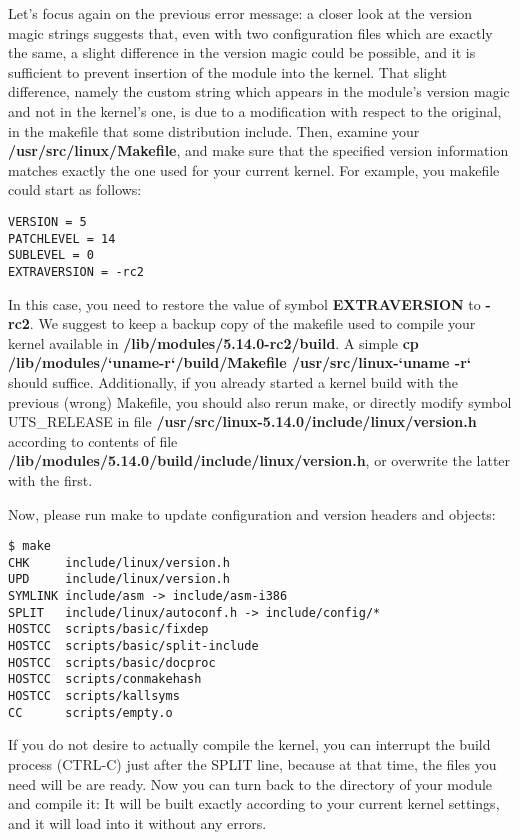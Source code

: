 \documentclass[10pt, oneside]{book}
\begin{document}
Let's focus again on the previous error message: a closer look at the version magic strings suggests that, even with two configuration files which are exactly the same, a slight difference in the version magic could be possible, and it is sufficient to prevent insertion of the module into the kernel.
That slight difference, namely the custom string which appears in the module's version magic and not in the kernel's one, is due to a modification with respect to the original, in the makefile that some distribution include.
Then, examine your \textbf{/usr/src/linux/Makefile}, and make sure that the specified version information matches exactly the one used for your current kernel. For example, you makefile could start as follows:

\begin{verbatim}
VERSION = 5
PATCHLEVEL = 14
SUBLEVEL = 0
EXTRAVERSION = -rc2
\end{verbatim}

In this case, you need to restore the value of symbol \textbf{EXTRAVERSION} to \textbf{-rc2}.
We suggest to keep a backup copy of the makefile used to compile your kernel available in \textbf{/lib/modules/5.14.0-rc2/build}.
A simple \textbf{cp /lib/modules/`uname-r`/build/Makefile /usr/src/linux-`uname -r`} should suffice.
Additionally, if you already started a kernel build with the previous (wrong) Makefile, you should also rerun make, or directly modify symbol UTS\_RELEASE in file \textbf{/usr/src/linux-5.14.0/include/linux/version.h} according to contents of file \textbf{/lib/modules/5.14.0/build/include/linux/version.h}, or overwrite the latter with the first.

Now, please run make to update configuration and version headers and objects:

\begin{verbatim}
$ make
CHK     include/linux/version.h
UPD     include/linux/version.h
SYMLINK include/asm -> include/asm-i386
SPLIT   include/linux/autoconf.h -> include/config/*
HOSTCC  scripts/basic/fixdep
HOSTCC  scripts/basic/split-include
HOSTCC  scripts/basic/docproc
HOSTCC  scripts/conmakehash
HOSTCC  scripts/kallsyms
CC      scripts/empty.o
\end{verbatim}

If you do not desire to actually compile the kernel, you can interrupt the build process (CTRL-C) just after the SPLIT line, because at that time, the files you need will be are ready.
Now you can turn back to the directory of your module and compile it: It will be built exactly according to your current kernel settings, and it will load into it without any errors.
\end{document}
